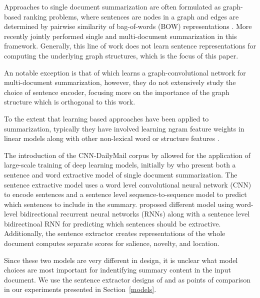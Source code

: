 

Approaches to single document summarization
are often formulated as graph-based ranking problems, where
sentences are nodes in a graph and edges are determined by pairwise 
similarity of bag-of-words (BOW) representations 
\cite{erkan2004lexrank,mihalcea2005language}. 
More recently \citet{wan2010towards}
jointly performed single and multi-document summarization in this framework. 
Generally, this line of work does not learn sentence representations for 
computing the underlying graph structures, which is the focus of this paper.

An notable exception is that of
\cite{yasunaga2017graph} which learns a graph-convolutional network for
multi-document summarization, however, they do not extensively study the 
choice of sentence encoder, focusing more on the importance of the 
graph structure which is orthogonal to this work.

To the extent that learning based approaches have been applied
to summarization, typically they have involved learning ngram feature weights 
in linear models along with other non-lexical word or structure features 
\cite{berg2011jointly,sipos2012large,durrett2016learning}.

The introduction of the CNN-DailyMail corpus by \cite{nips15_hermann}
allowed for the application of large-scale training of deep learning models,
initially by \citep{cheng2016neural} who present both a sentence and word
extractive model of single document summarization. The sentence extractive
model uses a word level convolutional neural network (CNN) to encode 
sentences and a sentence level sequence-to-sequence model to predict 
which sentences to include in the summary. \citet{nallapati2017summarunner}
proposed different model using word-level bidirectional recurrent neural 
networks (RNNs) along with a sentence level bidirectinoal RNN for 
predicting which sentences should be extractive. 
Additionally, the sentence
extractor creates representations of the whole document computes 
separate scores for salience, novelty, and location.

Since these two models are very different in design, it is unclear 
what model choices are most important for indentifying summary content 
in the input document. We use the sentence extractor designs of 
\citep{cheng2016neural} and \citep{nallapati2017summarunner} as points of 
comparison in our experiments presented in Section~\ref{models}.

